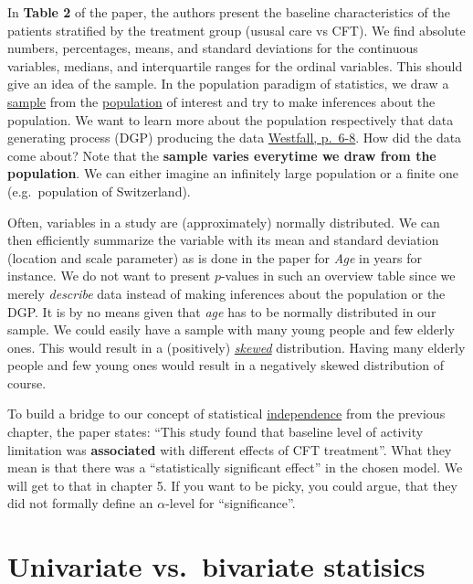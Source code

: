 \documentclass[
]{book}
\begin{document}
In \textbf{Table 2} of the paper, the authors present the baseline characteristics of the patients stratified by the treatment group (ususal care vs CFT).
We find absolute numbers, percentages, means, and standard deviations for the continuous variables, medians, and interquartile ranges for the ordinal variables.
This should give an idea of the sample. In the population paradigm of statistics, we draw a \href{https://en.wikipedia.org/wiki/Sampling_(statistics)}{sample} from
the \href{https://en.wikipedia.org/wiki/Statistical_population}{population} of interest and try to make inferences about the population. We want to learn
more about the population respectively that data generating process (DGP) producing the data \href{https://www.routledge.com/Understanding-Regression-Analysis-A-Conditional-Distribution-Approach/Westfall-Arias/p/book/9780367493516}{Westfall, p.~6-8}.
How did the data come about?
Note that the \textbf{sample varies everytime we draw from the population}.
We can either imagine an infinitely large population or a finite one (e.g.~population of Switzerland).

Often, variables in a study are (approximately) normally distributed.
We can then efficiently summarize the variable with its mean and standard deviation (location and scale parameter) as is done
in the paper for \emph{Age} in years for instance. We do not want to present \(p\)-values in such an overview table since we merely \emph{describe} data instead of
making inferences about the population or the DGP.
It is by no means given that \emph{age} has to be normally distributed in our sample. We could easily have a sample with many young people and few elderly ones.
This would result in a (positively) \href{https://en.wikipedia.org/wiki/Skewness}{\emph{skewed}} distribution. Having many elderly people and few young ones would
result in a negatively skewed distribution of course.

To build a bridge to our concept of statistical \hyperref[independence_of_events]{independence} from the previous chapter, the paper states:
``This study found that baseline level of activity limitation was \textbf{associated} with different effects of CFT treatment''.
What they mean is that there was a ``statistically significant effect'' in the chosen model. We will get to that in chapter 5.
If you want to be picky, you could argue, that they did not formally define an \(\alpha\)-level for ``significance''.

\section{Univariate vs.~bivariate statisics}\label{univariate-vs.-bivariate-statisics}
\end{document}
